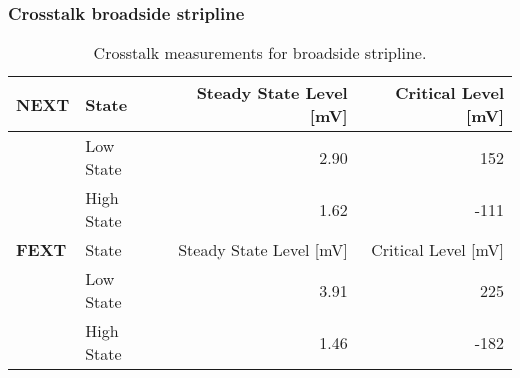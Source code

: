 \documentclass[../main.tex]{subfiles}
\begin{document}
\subsubsection{Crosstalk broadside stripline}

\begin{table}[h]
    \centering
    \begin{tabular}{l l|r r}
        \toprule[1pt]
        \textbf{NEXT} & State & Steady State Level [mV] & Critical Level [mV] \\
        \midrule
        & Low State & 2.90 & 152 \\
        & High State & 1.62 & -111 \\
        \midrule[1pt]
        \textbf{FEXT} & State & Steady State Level [mV] & Critical Level [mV] \\
        \midrule
        & Low State & 3.91 & 225 \\
        & High State & 1.46 & -182 \\
        \bottomrule[1pt]
    \end{tabular}
    \caption{Crosstalk measurements for broadside stripline.}
    \label{tab:meas-broadside-stripline2}
\end{table}
\end{document}
